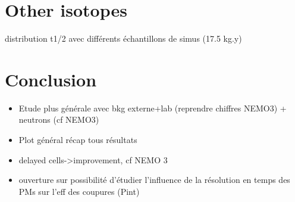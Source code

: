 \section{Other isotopes}

distribution t1/2 avec différents échantillons de simus (17.5 kg.y)

\section{Conclusion}
\begin{itemize}
\item Etude plus générale avec bkg externe+lab (reprendre chiffres NEMO3) + neutrons (cf NEMO3)
\item Plot général récap tous résultats
\item delayed cells->improvement, cf NEMO 3
\item ouverture sur possibilité d'étudier l'influence de la résolution en temps des PMs sur l'eff des coupures (Pint)
\end{itemize}
